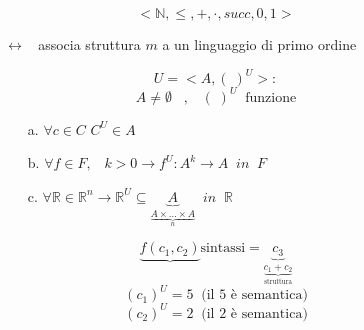 \documentclass{article}
\theoremstyle{break}
\theoremstyle{break}
\theoremstyle{break}
\theoremstyle{break}
\begin{document}
\begin{figure}[H]
  \begin{example}
    \[
    <\mathbb{N}, \le , +, \cdot, succ, 0, 1> 
    \] 
  \end{example}
\end{figure}

\begin{figure}[H]
  \begin{definition}[L\_Struttura]
    \(
  \leftrightarrow\;\;     \) associa struttura \( m \) a un linguaggio di primo ordine

    \[
    U = <A, (\;)^U>:
    \] 
    \[
    A \neq \emptyset \;\;\;,\;\;\; (\;)^U \;\;\text{funzione}
    \]
    \begin{itemize}
      \item[a.] \( \forall c \in C \) \( C^U \in A \) 
      \item[b.] \( \forall f \in F, \;\;\; k>0 \to f^U : A^k \to A \;\; in \;\;F \) 
      \item [c.] \( \forall \mathbb{R} \in \mathbb{R}^n \to \mathbb{R}^U \subseteq \underbrace{A}_{\underbrace{A \times \ldots \times A}_{n}} \;\; in \;\;\mathbb{R} \) 
    \end{itemize}
  \end{definition}
  \[
    \underbrace{f(c_1,c_2)}{\text{sintassi}} = \underbrace{c_3}_{\underbrace{c_1+c_2}_{\text{struttura}}}
  \] 
  \[
    (c_1)^U = 5 \;\;\text{(il 5 è semantica)}
  \] 
  \[
    (c_2)^U = 2 \;\;\text{(il 2 è semantica)}
  \] 
\end{figure}
\end{document}
